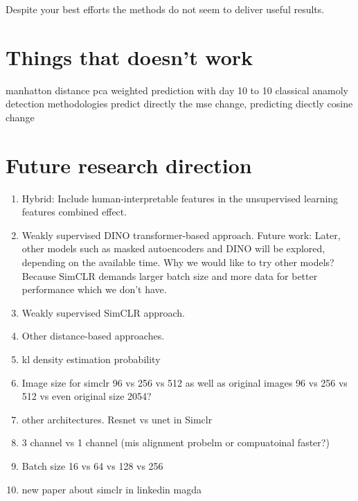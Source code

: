 Despite your best efforts the methods do not seem to deliver useful results.



\section{Things that doesn't work}
manhatton distance 
pca weighted 
prediction with day 10 to 10 classical anamoly detection methodologies
predict directly the mse change, predicting diectly cosine change

\section{Future research direction}

\begin{enumerate}
    \item Hybrid: Include human-interpretable features in the unsupervised learning features combined effect.
    \item Weakly supervised DINO transformer-based approach. Future work: Later, other models such as masked autoencoders and DINO will be explored, depending on the available time.
	Why we would like to try other models? Because SimCLR demands larger batch size and more data for better performance which we don't have.
    \item Weakly supervised SimCLR approach.
    \item Other distance-based approaches.
    \item kl density estimation probability
    \item Image size for simclr 96 vs 256 vs 512 as well as original images 96 vs 256 vs 512 vs even original size 2054?
    \item other architectures. Resnet vs unet in Simclr
    \item 3 channel vs 1 channel (mis alignment probelm or compuatoinal faster?)
    \item Batch size 16 vs 64 vs 128 vs 256
    \item new paper about simclr in linkedin magda

\end{enumerate}